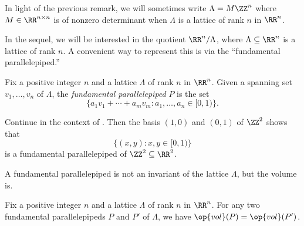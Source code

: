 \documentclass[../notes.tex]{subfiles}
\begin{document}
\begin{remark}
	In light of the previous remark, we will sometimes write $\Lambda=M\ZZ^n$ where $M\in\RR^{n\times n}$ is of nonzero determinant when $\Lambda$ is a lattice of rank $n$ in $\RR^n$.
\end{remark}
In the sequel, we will be interested in the quotient $\RR^n/\Lambda$, where $\Lambda\subseteq\RR^n$ is a lattice of rank $n$. A convenient way to represent this is via the ``fundamental parallelepiped.''
\begin{definition}
	Fix a positive integer $n$ and a lattice $\Lambda$ of rank $n$ in $\RR^n$. Given a spanning set $v_1,\ldots,v_n$ of $\Lambda$, the \textit{fundamental parallelepiped} $P$ is the set
	\[\{a_1v_1+\cdots+a_mv_m:a_1,\ldots,a_n\in[0,1)\}.\]
\end{definition}
\begin{example}
	Continue in the context of . Then the basis $(1,0)$ and $(0,1)$ of $\ZZ^2$ shows that
	\[\{(x,y):x,y\in[0,1)\}\]
	is a fundamental parallelepiped of $\ZZ^2\subseteq\RR^2$.
\end{example}
A fundamental parallelepiped is not an invariant of the lattice $\Lambda$, but the volume is.
\begin{lemma}
	Fix a positive integer $n$ and a lattice $\Lambda$ of rank $n$ in $\RR^n$. For any two fundamental parallelepipeds $P$ and $P'$ of $\Lambda$, we have $\op{vol}(P)=\op{vol}(P')$.
\end{lemma}
\end{document}
